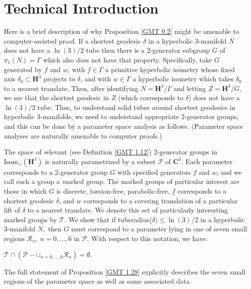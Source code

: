 \chapter{Technical Introduction}\label{Ch.TechIntro} %
Here is a brief description of why Proposition \ref{GMT 0.2} might be amenable to 
computer-assisted proof.
If a shortest geodesic $\delta$ in a hyperbolic $3$-manifold $N$ does not have 
a $\ln(3)/2$
tube then there is a 2-generator subgroup $G$ of $\pi_1(N) = \Gamma$
which also does not have that property.
Specifically, take $G$ generated by $f$ and $w$,
with $f \in \Gamma$ a primitive hyperbolic isometry
whose fixed axis $\delta_0 \subset \mathbf {H}^3$ projects to $\delta$, and 
with $w \in \Gamma$ a hyperbolic isometry
which takes $\delta_0$ to a nearest translate.
Then, after identifying $N=\mathbf {H}^3/\Gamma$ and letting 
$Z=\mathbf {H}^3/G$,
we see that the shortest geodesic in $Z$ (which corresponds to $\delta$)
does not have 
a $\ln(3)/2$ tube. 
Thus, to understand solid tubes around shortest geodesics in hyperbolic 
$3$-manifolds, we need to understand appropriate 2-generator groups, and this 
can be done by a parameter space analysis as follows.  (Parameter space 
analyses are naturally amenable to 
computer proofs.)

The space of {\textit relevant}
(see
Definition \ref{GMT 1.12})
2-generator groups 
in $\mathrm {Isom}_+(\mathbf {H}^3)$ is naturally
parametrized by a subset $\mathcal {P}$ of $\mathbf {C}^3.$  
Each parameter corresponds to a
2-generator group $G$ with specified generators $f$ and $w$, and we call 
such a group a {\textit marked group}. 
The marked groups of particular interest are those in which $G$ is
discrete, torsion-free, parabolic-free, $f$ corresponds to a shortest
geodesic $\delta$, and $w$ corresponds to a
covering translation of a particular lift of
$\delta$ to a nearest translate.  
We denote this set of particularly interesting marked groups by $\mathcal {T}.$
We show that if tuberadius($\delta) \le \ln(3)/2$ 
in a hyperbolic $3$-manifold $N,$ then 
$G$ must correspond to a parameter lying in one of seven small regions
$\mathcal {R}_n,\ n=0,\ldots,6$ 
in $\mathcal {P}$.  
With respect to this notation, we have:

\begin{proposition} \label{GMT 1.28}
$\mathcal {T} \cap (\mathcal {P} - \mathbf{\cup}_{n=0,\ldots,6}\mathcal {R}_n) = \emptyset.$
\vfill\end{proposition}

The full statement of Proposition \ref{GMT 1.28}
explicitly describes the seven small
regions of the parameter space as well as some associated data.

